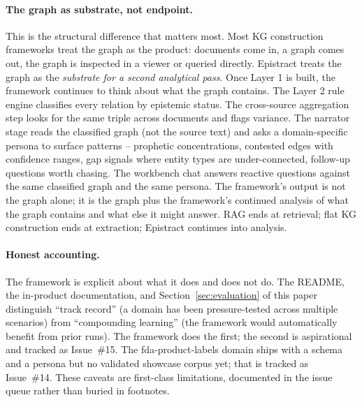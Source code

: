 \paragraph{The graph as substrate, not endpoint.}
This is the structural difference that matters most. Most KG construction frameworks treat the graph as the product: documents come in, a graph comes out, the graph is inspected in a viewer or queried directly. Epistract treats the graph as the \emph{substrate for a second analytical pass}. Once Layer 1 is built, the framework continues to think about what the graph contains. The Layer 2 rule engine classifies every relation by epistemic status. The cross-source aggregation step looks for the same triple across documents and flags variance. The narrator stage reads the classified graph (not the source text) and asks a domain-specific persona to surface patterns -- prophetic concentrations, contested edges with confidence ranges, gap signals where entity types are under-connected, follow-up questions worth chasing. The workbench chat answers reactive questions against the same classified graph and the same persona. The framework's output is not the graph alone; it is the graph plus the framework's continued analysis of what the graph contains and what else it might answer. RAG ends at retrieval; flat KG construction ends at extraction; Epistract continues into analysis.

\paragraph{Honest accounting.}
The framework is explicit about what it does and does not do. The README, the in-product documentation, and Section~\ref{sec:evaluation} of this paper distinguish ``track record'' (a domain has been pressure-tested across multiple scenarios) from ``compounding learning'' (the framework would automatically benefit from prior runs). The framework does the first; the second is aspirational and tracked as Issue~\#15. The fda-product-labels domain ships with a schema and a persona but no validated showcase corpus yet; that is tracked as Issue~\#14. These caveats are first-class limitations, documented in the issue queue rather than buried in footnotes.
